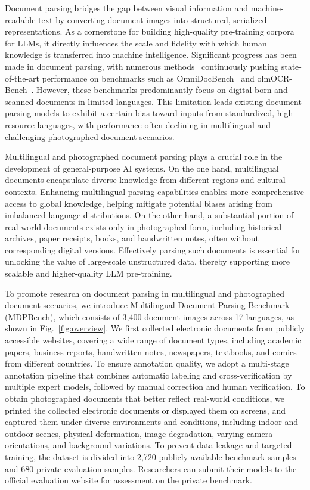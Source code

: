 \documentclass[runningheads]{llncs}
\begin{document}
Document parsing bridges the gap between visual information and machine-readable text by converting document images into structured, serialized representations. As a cornerstone for building high-quality pre-training corpora for LLMs, it directly influences the scale and fidelity with which human knowledge is transferred into machine intelligence. Significant progress has been made in document parsing, with numerous methods~\cite{mineru, ppstruct3, monkeyocr, monkeyocr1.5, dotsocr, paddleocr-vl, paddleocr-vl-1.5, olmocr, olmocr2} continuously pushing state-of-the-art performance on benchmarks such as OmniDocBench~\cite{omnidocbench} and olmOCR-Bench~\cite{olmocr}. However, these benchmarks predominantly focus on digital-born and scanned documents in limited languages. This limitation leads existing document parsing models to exhibit a certain bias toward inputs from standardized, high-resource languages, with performance often declining in multilingual and challenging photographed document scenarios.

Multilingual and photographed document parsing plays a crucial role in the development of general-purpose AI systems. On the one hand, multilingual documents encapsulate diverse knowledge from different regions and cultural contexts. Enhancing multilingual parsing capabilities enables more comprehensive access to global knowledge, helping mitigate potential biases arising from imbalanced language distributions. On the other hand, a substantial portion of real-world documents exists only in photographed form, including historical archives, paper receipts, books, and handwritten notes, often without corresponding digital versions. Effectively parsing such documents is essential for unlocking the value of large-scale unstructured data, thereby supporting more scalable and higher-quality LLM pre-training.

To promote research on document parsing in multilingual and photographed document scenarios, we introduce Multilingual Document Parsing Benchmark (MDPBench), which consists of 3,400 document images across 17 languages, as shown in Fig.~\ref{fig:overview}. We first collected electronic documents from publicly accessible websites, covering a wide range of document types, including academic papers, business reports, handwritten notes, newspapers, textbooks, and comics from different countries. To ensure annotation quality, we adopt a multi-stage annotation pipeline that combines automatic labeling and cross-verification by multiple expert models, followed by manual correction and human verification. To obtain photographed documents that better reflect real-world conditions, we printed the collected electronic documents or displayed them on screens, and captured them under diverse environments and conditions, including indoor and outdoor scenes, physical deformation, image degradation, varying camera orientations, and background variations.
To prevent data leakage and targeted training, the dataset is divided into 2,720 publicly available benchmark samples and 680 private evaluation samples. Researchers can submit their models to the official evaluation website for assessment on the private benchmark.
\end{document}
